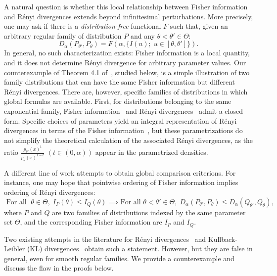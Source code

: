 \documentclass{article}
\theoremstyle{plain}
\theoremstyle{definition}
\theoremstyle{remark}
\begin{document}
A natural question is whether this local relationship between Fisher information and Rényi divergences extends beyond infinitesimal perturbations. More precisely, one may ask if there is a \emph{distribution-free} functional $F$ such that, given an arbitrary regular family of distribution $P$ and any $\theta < \theta' \in \Theta$:  \[D_\alpha(P_{\theta'}, P_\theta) = F(\alpha, \{I(u); \;u \in [\theta,\theta']\}).\] In general, no such characterization exists: Fisher information is a local quantity, and it does not determine Rényi divergence for arbitrary parameter values. Our counterexample of Theorem 4.1 of~\citet{Abbasnejad2006}, studied below, is a simple illustration of two family distributions that can have the same Fisher information but different Rényi divergences. There are, however, specific families of distributions in which global formulas are available. First, for distributions belonging to the same exponential family, Fisher information~\citep[Theorem~5.4]{Lehmann1998} and Rényi divergences~\citep[Chapter~2]{Liese1987} admit a closed form. Specific choices of parameters yield an integral representation of Rényi divergences in terms of the Fisher information~\citep{Bercher2012}, but these parametrizations do not simplify the theoretical calculation of the associated Rényi divergences, as the ratio $\frac{p_{\theta'}(x)^t}{p_{\theta}(x)^{1-t}}$ $(t \in (0,\alpha))$ appear in the parametrized densities.


A different line of work attempts to obtain global comparison criterions. For instance, one may hope that pointwise ordering of Fisher information implies ordering of Rényi divergences:
\[\text{ For all }\; \theta \in \Theta,\; I_P(\theta) \leq I_Q(\theta) \implies \text{For all } \theta < \theta' \in \Theta,\; D_\alpha(P_{\theta'},P_\theta) \leq D_\alpha(Q_{\theta'},Q_\theta),\]
where $P$ and $Q$ are two families of distributions indexed by the same parameter set $\Theta$, and the corresponding Fisher information are $I_P$ and $I_Q$.

Two existing attempts in the literature for Rényi divergences~\citep[Theorem~4.1]{Abbasnejad2006} and Kullback-Leibler (KL) divergences~\citep[Theorem~3.1]{Habibi2006} obtain such a statement. However, but they are false in general, even for smooth regular families. We provide a counterexample and discuss the flaw in the proofs below.
\end{document}
